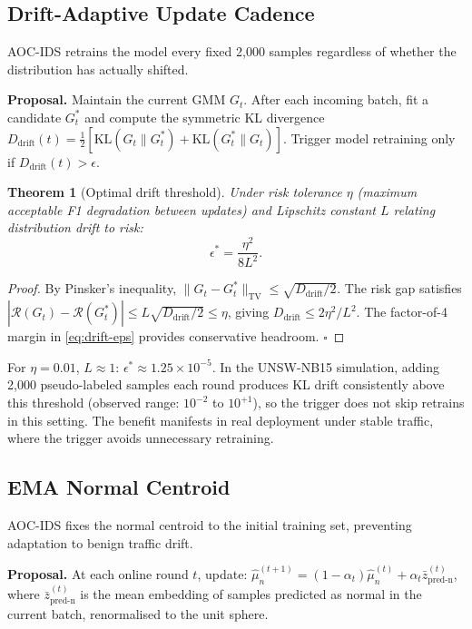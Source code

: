 \documentclass[conference]{IEEEtran}
\newtheorem{theorem}{Theorem}
\begin{document}
\subsection{Drift-Adaptive Update Cadence}

AOC-IDS retrains the model every fixed 2,000 samples regardless of whether
the distribution has actually shifted.

\textbf{Proposal.} Maintain the current GMM $G_t$. After each incoming
batch, fit a candidate $G_t^*$ and compute the symmetric KL divergence
$D_{\mathrm{drift}}(t) = \frac{1}{2}[\mathrm{KL}(G_t \| G_t^*) +
\mathrm{KL}(G_t^* \| G_t)]$. Trigger model retraining only if
$D_{\mathrm{drift}}(t) > \epsilon$.

\begin{theorem}[Optimal drift threshold]\label{thm:drift-eps}
Under risk tolerance $\eta$ (maximum acceptable F1 degradation between
updates) and Lipschitz constant $L$ relating distribution drift to risk:
\begin{equation}
\epsilon^* = \frac{\eta^2}{8L^2}.
\label{eq:drift-eps}
\end{equation}
\end{theorem}

\begin{proof}
By Pinsker's inequality, $\|G_t - G_t^*\|_{\mathrm{TV}} \le \sqrt{D_{\mathrm{drift}}/2}$.
The risk gap satisfies $|\mathcal{R}(G_t) - \mathcal{R}(G_t^*)| \le
L\sqrt{D_{\mathrm{drift}}/2} \le \eta$, giving
$D_{\mathrm{drift}} \le 2\eta^2/L^2$. The factor-of-4 margin in
\eqref{eq:drift-eps} provides conservative headroom. $\square$
\end{proof}

For $\eta = 0.01$, $L \approx 1$: $\epsilon^* \approx 1.25 \times 10^{-5}$.
In the UNSW-NB15 simulation, adding 2,000 pseudo-labeled samples each round
produces KL drift consistently above this threshold (observed range:
$10^{-2}$ to $10^{+1}$), so the trigger does not skip retrains in this
setting. The benefit manifests in real deployment under stable traffic,
where the trigger avoids unnecessary retraining.

\subsection{EMA Normal Centroid}

AOC-IDS fixes the normal centroid to the initial training set,
preventing adaptation to benign traffic drift.

\textbf{Proposal.} At each online round $t$, update:
$\hat\mu_n^{(t+1)} = (1-\alpha_t)\hat\mu_n^{(t)} + \alpha_t\bar z_{\mathrm{pred\text{-}n}}^{(t)}$,
where $\bar z_{\mathrm{pred\text{-}n}}^{(t)}$ is the mean embedding of
samples predicted as normal in the current batch, renormalised to the unit sphere.
\end{document}
